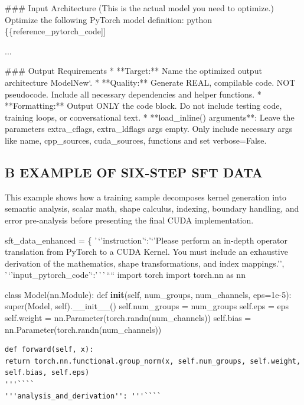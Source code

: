 \documentclass[
  10
]{article}
\newenvironment{Shaded}{}{}
\newcommand{\NormalTok}[1]{#1}
\begin{document}
\begin{Shaded}
\begin{Highlighting}[]
\NormalTok{\#\#\# Input Architecture (This is the actual model you need to optimize.)}
\NormalTok{Optimize the following PyTorch model definition:}
\NormalTok{\textasciigrave{}\textasciigrave{}\textasciigrave{}python}
\NormalTok{\{\{reference\_pytorch\_code]]}

\NormalTok{...}

\NormalTok{\#\#\# Output Requirements}
\NormalTok{* **Target:** Name the optimized output architecture \textasciigrave{}ModelNew‘.}
\NormalTok{* **Quality:** Generate REAL, compilable code. NOT pseudocode. Include all necessary dependencies and helper functions.}
\NormalTok{* **Formatting:** Output ONLY the code block. Do not include testing code, training loops, or conversational text.}
\NormalTok{* **load\_inline() arguments**: Leave the parameters extra\_cflags, extra\_ldflags args empty. Only include necessary args like name, cpp\_sources, cuda\_sources, functions and set verbose=False. }
\end{Highlighting}
\end{Shaded}

\subsection{B EXAMPLE OF SIX-STEP SFT
DATA}\label{b-example-of-six-step-sft-data}

This example shows how a training sample decomposes kernel generation
into semantic analysis, scalar math, shape calculus, indexing, boundary
handling, and error pre-analysis before presenting the final CUDA
implementation.

sft\_data\_enhanced = \{ '\,`'instruction'`:'`'Please perform an
in-depth operator translation from PyTorch to a CUDA Kernel. You must
include an exhaustive derivation of the mathematics, shape
transformations, and index mappings.'',
'\,`'input\_pytorch\_code'`:'\,'\,'\,```` import torch import torch.nn
as nn

class Model(nn.Module): def \textbf{init}(self, num\_groups,
num\_channels, eps=1e-5): super(Model, self).\_\_init\_\_()
self.num\_groups = num\_groups self.eps = eps self.weight =
nn.Parameter(torch.randn(num\_channels)) self.bias =
nn.Parameter(torch.randn(num\_channels))

\begin{verbatim}
def forward(self, x):
return torch.nn.functional.group_norm(x, self.num_groups, self.weight, self.bias, self.eps)
'''````
'''analysis_and_derivation'': '''````
\end{verbatim}
\end{document}
